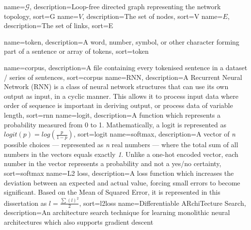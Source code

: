 {
    name=\(\mathcal{G}\),
    description={Loop-free directed graph representing the network topology},
    sort=G
}
{
    name=\(V\),
    description={The set of nodes},
    sort=V
}
{
    name=\(E\),
    description={The set of links},
    sort=E
}

{
    name=token,
    description={A word, number, symbol, or other character forming part of a sentence or array of tokens},
    sort=token
}

{
    name=corpus,
    description={A file containing every tokenised sentence in a dataset / series of sentences},
    sort=corpus
}
{
    name={RNN},
    description={A Recurrent Neural Network (RNN) is a class of neural network structures that
    can use its own output as input, in a cyclic manner. This allows it to process input data where order of sequence is important in deriving output, or process data of variable length},
    sort=rnn
}
{
    name={logit},
    description={A function which represents a probability measured from 0 to 1. Mathematically, a logit is represented as \(logit(p)=log(\frac{p}{1-p})\)},
    sort=logit
}
{
    name={softmax},
    description={A vector of \textit{n} possible choices --- represented as \textit{n} real numbers --- where the total sum of all numbers in the vectors equals exactly \textit{1}. Unlike a one-hot encoded vector, each number in the vector represents a probability and not a yes/no certainty},
    sort=softmax
}
{
    name={L2 loss},
    description={A loss function which increases the deviation between an expected and actual value, forcing small errors to become significant. Based on the Mean of Squared Error, it is represented in this dissertation as \(l=\frac{\sum(l)^2}{2}\)},
    sort=l2loss
}
{
    name={Differentiable ARchiTecture Search},
    description={An architecture search technique for learning monolithic neural architectures which also supports gradient descent}
}